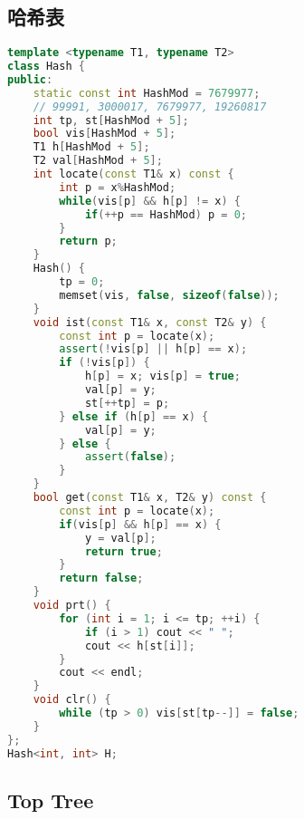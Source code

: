 \subsection{哈希表}

\begin{lstlisting}[language=C++]
template <typename T1, typename T2>
class Hash {
public:
    static const int HashMod = 7679977;
    // 99991, 3000017, 7679977, 19260817
    int tp, st[HashMod + 5];
    bool vis[HashMod + 5];
    T1 h[HashMod + 5];
    T2 val[HashMod + 5];
    int locate(const T1& x) const {
        int p = x%HashMod;
        while(vis[p] && h[p] != x) {
            if(++p == HashMod) p = 0;
        }
        return p;
    }
    Hash() {
        tp = 0;
        memset(vis, false, sizeof(false));
    }
    void ist(const T1& x, const T2& y) {
        const int p = locate(x);
        assert(!vis[p] || h[p] == x);
        if (!vis[p]) {
            h[p] = x; vis[p] = true;
            val[p] = y;
            st[++tp] = p;
        } else if (h[p] == x) {
            val[p] = y;
        } else {
            assert(false);
        }
    }
    bool get(const T1& x, T2& y) const {
        const int p = locate(x);
        if(vis[p] && h[p] == x) {
            y = val[p];
            return true;
        }
        return false;
    }
    void prt() {
        for (int i = 1; i <= tp; ++i) {
            if (i > 1) cout << " ";
            cout << h[st[i]];
        }
        cout << endl;
    }
    void clr() {
        while (tp > 0) vis[st[tp--]] = false;
    }
};
Hash<int, int> H;
\end{lstlisting}

\subsection{Top Tree}

